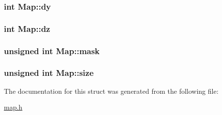 \subsubsection[{\texorpdfstring{dy}{dy}}]{\setlength{\rightskip}{0pt plus 5cm}int Map\+::dy}\hypertarget{structMap_a64d19e88d54fa48e437044c88f674308}{}\label{structMap_a64d19e88d54fa48e437044c88f674308}
\subsubsection[{\texorpdfstring{dz}{dz}}]{\setlength{\rightskip}{0pt plus 5cm}int Map\+::dz}\hypertarget{structMap_a1f17ec06f672496c2582b60dce199f68}{}\label{structMap_a1f17ec06f672496c2582b60dce199f68}
\subsubsection[{\texorpdfstring{mask}{mask}}]{\setlength{\rightskip}{0pt plus 5cm}unsigned int Map\+::mask}\hypertarget{structMap_a2211aadc9745a27b0e07a3af85989bd5}{}\label{structMap_a2211aadc9745a27b0e07a3af85989bd5}
\subsubsection[{\texorpdfstring{size}{size}}]{\setlength{\rightskip}{0pt plus 5cm}unsigned int Map\+::size}\hypertarget{structMap_a73754296f937e5d5fbf40b4be90c8e8c}{}\label{structMap_a73754296f937e5d5fbf40b4be90c8e8c}


The documentation for this struct was generated from the following file\+:\begin{DoxyCompactItemize}
\item 
\hyperlink{map_8h}{map.\+h}\end{DoxyCompactItemize}
